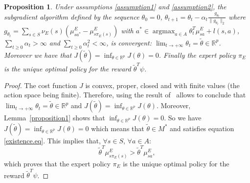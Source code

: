 \documentclass{article}
\newtheorem{prop}{Proposition}
\newcommand{\argmax}{\operatorname*{argmax}} %
\begin{document}
\begin{prop}
Under assumptions \ref{assumption1} and \ref{assumption2}, the
subgradient algorithm defined by the sequence $\theta_0=0$,
$\theta_{t+1}=\theta_t-\alpha_t\frac{g_{\theta_t}}{\|g_{\theta_t}\|_2}$
where $g_{\theta_t}=\sum_{s\in
S}\nu_E(s)(\mu^E_{sa^*}-\mu^E_{s\pi_E(s)})$ with
$a^*\in\argmax_{a\in A}\theta_t^T\mu^E_{sa}+l(s,a)$,
$\sum_{t\geq0}\alpha_t>\infty$ and $\sum_{t\geq0}\alpha_t^2<\infty$,
is convergent:
$\lim_{t\rightarrow+\infty}\theta_t=\tilde{\theta}\in\mathbb{R}^p$.
Moreover we have that
$J(\tilde{\theta})=\inf_{\theta\in\mathbb{R}^p}J(\theta)=0$. Finally
the expert policy $\pi_E$ is the unique optimal policy for the
reward $\tilde{\theta}^T\psi$.
\end{prop}
\begin{proof}
The cost function  $J$ is convex, proper, closed and with finite
values (the action space being finite). Therefore, using the result
of~\cite[section~5]{correa1993convergence} allows to conclude that
$\lim_{t\rightarrow+\infty}\theta_t=\tilde{\theta}\in\mathbb{R}^p$
and $J(\tilde{\theta})=\inf_{\theta\in\mathbb{R}^p}J(\theta)$.
%
Moreover, Lemma~\ref{proposition1} shows that
$\inf_{\theta\in\mathbb{R}^p}J(\theta)=0$.
%
So we have
$J(\tilde{\theta})=\inf_{\theta\in\mathbb{R}^p}J(\theta)=0$ which
means that $\tilde{\theta}\in M^*$ and satisfies equation
\eqref{existence.eq}. This implies that, $\forall s\in S$, $\forall
a\in A$:
\begin{equation}
\tilde{\theta}^T\mu^E_{s\pi_E(s)}>\tilde{\theta}^T\mu^E_{sa},
\end{equation}
which proves that the expert policy $\pi_E$ is the unique optimal
policy for the reward $\tilde{\theta}^T\psi$.
\end{proof}
\end{document}
